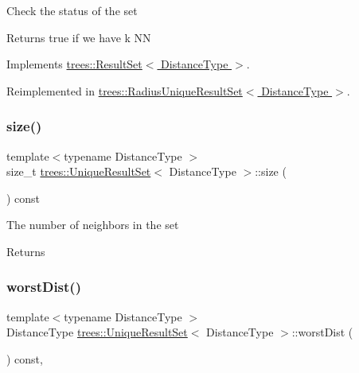 Check the status of the set \begin{DoxyReturn}{Returns}
true if we have k NN 
\end{DoxyReturn}


Implements \hyperlink{classtrees_1_1_result_set}{trees\+::\+Result\+Set$<$ Distance\+Type $>$}.



Reimplemented in \hyperlink{classtrees_1_1_radius_unique_result_set_a0a402d8fb16cfaa233d43bdcb5b3ab97}{trees\+::\+Radius\+Unique\+Result\+Set$<$ Distance\+Type $>$}.

\mbox{\label{classtrees_1_1_unique_result_set_a3b0df0041064e4e255e8cc22d142eab8}} 
\subsubsection{\texorpdfstring{size()}{size()}}
{\footnotesize\ttfamily template$<$typename Distance\+Type $>$ \\
size\+\_\+t \hyperlink{classtrees_1_1_unique_result_set}{trees\+::\+Unique\+Result\+Set}$<$ Distance\+Type $>$\+::size (\begin{DoxyParamCaption}{ }\end{DoxyParamCaption}) const\hspace{0.3cm}{\ttfamily [inline]}}

The number of neighbors in the set \begin{DoxyReturn}{Returns}

\end{DoxyReturn}
\mbox{\label{classtrees_1_1_unique_result_set_a2301eba6dae87959cc50668dd2307d4d}} 
\subsubsection{\texorpdfstring{worst\+Dist()}{worstDist()}}
{\footnotesize\ttfamily template$<$typename Distance\+Type $>$ \\
Distance\+Type \hyperlink{classtrees_1_1_unique_result_set}{trees\+::\+Unique\+Result\+Set}$<$ Distance\+Type $>$\+::worst\+Dist (\begin{DoxyParamCaption}{ }\end{DoxyParamCaption}) const\hspace{0.3cm}{\ttfamily [inline]}, {\ttfamily [virtual]}}

